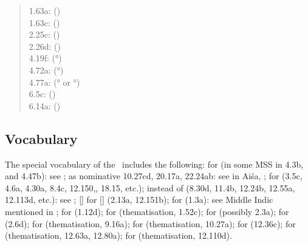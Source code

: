 \begin{quote}
1.63a:  () \\
1.63c:  () \\
2.25c:  () \\
2.26d:  () \\
4.19f:  (°) \\
4.72a:  (°) \\
4.77a:  (° or °)
 \\
6.5c:  () \\
6.14a:  () \\
\end{quote}




\subsection{Vocabulary}

The special vocabulary of the \VSS\ includes the following:
 for  (in some MSS in 4.3b, and 4.47b): 
        see ; 
 as nominative 10.27cd, 20.17a, 22.24ab: 
        see  in Aiśa, ;
 for  (3.5c, 4.6a, 4.30a, 8.4c, 12.150,, 18.15, etc.);
 instead of  (8.30d, 11.4b, 12.24b, 12.55a,\linebreak
 12.113d, etc.): 
        see ;
[] for [] (2.13a, 12.151b);
 for  (1.3a): see Middle Indic  mentioned in
        ; 
 for  (1.12d);
 for  (thematisation, 1.52c);
 for  (possibly 2.3a);
 for  (2.6d);
 for  (thematisation, 9.16a);
 for  (thematisation, 10.27a);
 for  (12.36c);
 for  (thematisation, 12.63a, 12.80a);
 for  (thematisation, 12.110d).





